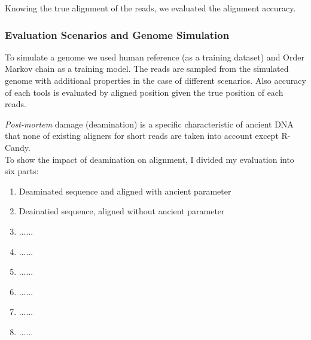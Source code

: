 \documentclass[11pt,a4paper]{report}
\begin{document}
Knowing the true alignment of the reads, we evaluated the alignment accuracy.\\ 



\subsubsection{Evaluation Scenarios and Genome Simulation}

To simulate a genome we used human reference (as a training dataset) and  
Order Markov chain as a training model. The reads are sampled from the simulated genome 
with additional properties in the case of different scenarios. Also accuracy of
each tools is evaluated by aligned position given the true position of each reads.

\emph{Post-mortem} damage (deamination) is a specific characteristic of ancient 
DNA that none of existing aligners for short reads are taken into account except R-Candy.\\

To show the impact of deamination on alignment, I divided my evaluation into six parts:
\begin{enumerate}
\item Deaminated sequence and aligned with ancient parameter
\item Deainatied sequence, aligned without ancient parameter
\item ......
\item ......
\item ......
\item ......
\item ......
\item ......
\end{enumerate}
\end{document}

